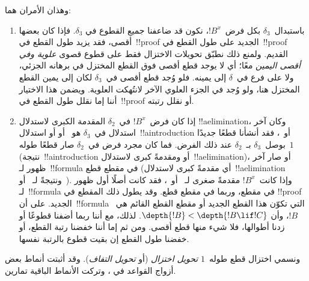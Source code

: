 \documentclass[../../../include/open-logic-section]{subfiles}
\begin{document}
وهذان الأمران هما:
\begin{enumerate}
  \item باستبدال~$\delta_3$ بكل فرض~$!B^x$، نكون قد ضاعفنا جميع القطوع في
  $\delta_3$. فإذا كان بعضها أقصى، فقد يزيد طول القطع في~!!{proof} الجديد
  على طول القطع في~!!{proof} القديم. ولمنع ذلك نطبّق تحويلات الاختزال فقط
  على قطوع قصوى \emph{علوية وفي أقصى اليمين} معًا؛ أي لا يوجد قطع أقصى فوق
  القطع المختزل في برهانه الجزئي، ولا على فرع في~$\delta$ إلى يمينه. فلو
  وُجد قطع أقصى في~$\delta_3$ لكان إلى يمين القطع المختزل هنا، ولو وُجد في
  الجزء العلوي الآخر لانتُهكت العلوية. ويضمن هذا الاختيار أننا إما نقلل طول
  القطع في~!!{proof} أو نقلل رتبته.
  \item إذا كان فرض~$!B^x$ في~$\delta_2$ المقدمة الكبرى لاستدلال
  !!a{elimination}، وكان آخر استدلال في~$\delta_3$ هو~\Elim{\lor} أو
  \Elim{\lexists} أو استدلال~!!a{introduction} أو~\FalseInt، فقد أنشأنا
  قطعًا جديدًا بوصل~$\delta_3$ بـ~$\delta_2$ عند ذلك الفرض. فما كان مجرد
  فرض في~$\delta_2$ صار قطعًا طوله~$1$ (نتيجة~!!a{introduction} أو
  \FalseInt ومقدمةً كبرى لاستدلال~!!a{elimination})، أو صار آخر ظهور
  لـ~!!{formula} في مقطع قطع (أي مقدمةً كبرى لاستدلال~!!a{elimination}
  ونتيجةً لـ~\Elim{\lor} أو~\Elim{\lexists}). وإذا كانت~$!B^x$ مقدمةً
  صغرى لـ~\Elim{\lor} أو~\Elim{\lexists}، فقد كانت أصلًا أول ظهور
  لـ~!!{formula} في مقطع، وربما في مقطع قطع. وقد يطول ذلك المقطع في
  !!{proof} الجديد. على أن~!!{formula} التي تكوّن هذا القطع الجديد أو
  مقطع القطع القائم هي~$!B$، وأن
  $\depth{!B} < \depth{!B \lif !C}$. لذلك، مع أننا ربما أضفنا قطوعًا أو
  زدنا أطوالها، فلا شيء منها قطع أقصى. ومن ثم إما أننا خفضنا رتبة القطع، أو
  خفضنا طول القطع إن بقيت قطوع بالرتبة نفسها.
\end{enumerate}

ونسمي اختزال قطع طوله~$1$ \emph{تحويل اختزال} (أو \emph{تحويل
التفاف}). وقد أثبتت أنماط بعض أزواج القواعد في
، وتركت الأنماط الباقية تمارين.
\end{document}
